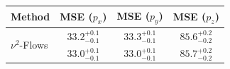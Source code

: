     \begin{tabular}{lccc}
        \toprule
        Method & MSE ($p_x$) & MSE ($p_y$) & MSE ($p_z$) \\
        \midrule
         \multirow{2}{*}{$\nu^2$-Flows}& $33.2_{-0.1}^{+0.1}$ & $33.3_{-0.1}^{+0.1}$ & $85.6_{-0.2}^{+0.2}$ \\
         & $33.0_{-0.1}^{+0.1}$ & $33.0_{-0.1}^{+0.1}$ & $85.7_{-0.2}^{+0.2}$ \\
        \bottomrule
    \end{tabular}